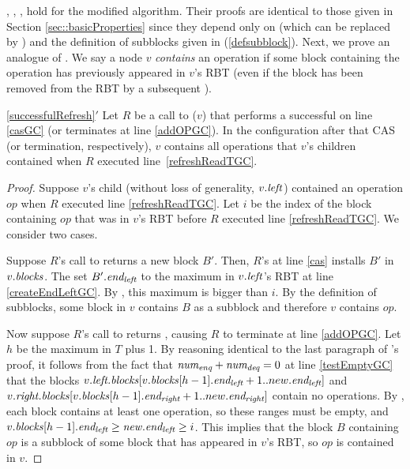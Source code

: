, , ,  
hold for the modified algorithm.  Their proofs are identical to those given in 
Section \ref{sec::basicProperties} since they  depend only on  (which can be replaced by )
and the definition of subblocks given in (\ref{defsubblock}).
Next, we prove an analogue of .
We say a node $v$ \emph{contains} an operation
if some block containing the operation has previously appeared in $v$'s RBT (even if 
the block has been removed from the RBT by a subsequent ).

\begin{customlemma}{\ref{successfulRefresh}$'$}
\label{successfulRefreshGC}
Let $R$ be a call to ($v$) that performs a successful  on line \ref{casGC} (or terminates at line \ref{addOPGC}).
In the configuration after that CAS (or termination, respectively), $v$ contains all operations that $v$'s children contained 
when $R$ executed line~\ref{refreshReadTGC}.
\end{customlemma}
\begin{proof}
Suppose $v$'s child (without loss of generality, $v.\mbox{\textit{left}}$) contained an operation $op$ 
when $R$ executed line \ref{refreshReadTGC}.
Let $i$ be the index of the block containing $op$ that was in $v$'s RBT before 
$R$ executed line \ref{refreshReadTGC}.
We consider two cases.

Suppose $R$'s call to  returns a new block $B'$.  Then, $R$'s  at line \ref{cas} 
installs $B'$ in $v.\mbox{\textit{blocks}}$.
The  set $B'.\mbox{\textit{end\textsubscript{left}}}$ to the maximum  in $v.\mbox{\textit{left}}$'s RBT at line \ref{createEndLeftGC}.
By , this maximum  is bigger than $i$.
By the definition of subblocks, some block in $v$ contains $B$ as a subblock
and therefore $v$ contains $op$.

Now suppose $R$'s call to  returns \nl, causing $R$ to terminate at line \ref{addOPGC}.
Let $h$ be the maximum  in $T$ plus 1.
By reasoning identical to the last paragraph of 's proof,
it follows from the fact that $\mbox{\textnormal{\textit{num\textsubscript{enq}}}}+\mbox{\textnormal{\textit{num\textsubscript{deq}}}}=0$ at line \ref{testEmptyGC}
that the blocks $v.\mbox{\textit{left.blocks}}[v.\mbox{\textit{blocks}}[h-1].\mbox{\textit{end\textsubscript{left}}}+1..new.\mbox{\textit{end\textsubscript{left}}}]$ and
$v.\mbox{\textit{right.blocks}}[v.\mbox{\textit{blocks}}[h-1].\mbox{\textit{end\textsubscript{right}}}+1..new.\mbox{\textit{end\textsubscript{right}}}]$
contain no operations.
By , each block contains at least one operation, so
these ranges must be empty, and $v.\mbox{\textit{blocks}}[h-1].\mbox{\textit{end\textsubscript{left}}} \geq \mbox{\textnormal{\textit{new}}}.\mbox{\textit{end\textsubscript{left}}}\geq i$.
This implies that the block $B$ containing $op$ is a subblock of some block that has appeared
in $v$'s RBT, so $op$ is contained in $v$.
\end{proof}

